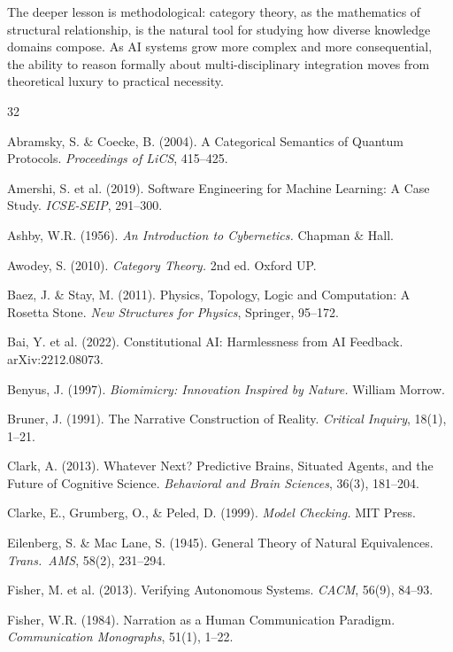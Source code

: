 \documentclass[11pt,a4paper]{article}
\begin{document}
The deeper lesson is methodological: category theory, as the mathematics of structural relationship, is the natural tool for studying how diverse knowledge domains compose. As AI systems grow more complex and more consequential, the ability to reason formally about multi-disciplinary integration moves from theoretical luxury to practical necessity.

\begin{thebibliography}{32}

Abramsky, S. \& Coecke, B. (2004).
A Categorical Semantics of Quantum Protocols.
\textit{Proceedings of LiCS}, 415--425.

Amershi, S. et al. (2019).
Software Engineering for Machine Learning: A Case Study.
\textit{ICSE-SEIP}, 291--300.

Ashby, W.R. (1956).
\textit{An Introduction to Cybernetics.}
Chapman \& Hall.

Awodey, S. (2010).
\textit{Category Theory.} 2nd ed.
Oxford UP.

Baez, J. \& Stay, M. (2011).
Physics, Topology, Logic and Computation: A Rosetta Stone.
\textit{New Structures for Physics}, Springer, 95--172.

Bai, Y. et al. (2022).
Constitutional AI: Harmlessness from AI Feedback.
arXiv:2212.08073.

Benyus, J. (1997).
\textit{Biomimicry: Innovation Inspired by Nature.}
William Morrow.

Bruner, J. (1991).
The Narrative Construction of Reality.
\textit{Critical Inquiry}, 18(1), 1--21.

Clark, A. (2013).
Whatever Next? Predictive Brains, Situated Agents, and the Future of Cognitive Science.
\textit{Behavioral and Brain Sciences}, 36(3), 181--204.

Clarke, E., Grumberg, O., \& Peled, D. (1999).
\textit{Model Checking.}
MIT Press.

Eilenberg, S. \& Mac Lane, S. (1945).
General Theory of Natural Equivalences.
\textit{Trans.\ AMS}, 58(2), 231--294.

Fisher, M. et al. (2013).
Verifying Autonomous Systems.
\textit{CACM}, 56(9), 84--93.

Fisher, W.R. (1984).
Narration as a Human Communication Paradigm.
\textit{Communication Monographs}, 51(1), 1--22.


\end{thebibliography}
\end{document}
